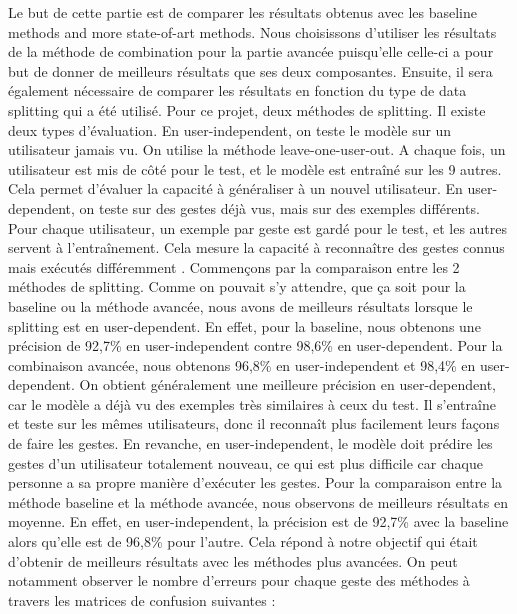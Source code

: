 \documentclass{article}
\begin{document}
Le but de cette partie est de comparer les résultats obtenus avec les baseline methods and more state-of-art methods. Nous choisissons d’utiliser les résultats de la méthode de combination pour la partie avancée puisqu’elle celle-ci a pour but de donner de meilleurs résultats que ses deux composantes. Ensuite, il sera également nécessaire de comparer les résultats en fonction du type de data splitting qui a été utilisé. Pour ce projet, deux méthodes de splitting. Il existe deux types d’évaluation. En user-independent, on teste le modèle sur un utilisateur jamais vu. On utilise la méthode leave-one-user-out.  A chaque fois, un utilisateur est mis de côté pour le test, et le modèle est entraîné sur les 9 autres. Cela permet d’évaluer la capacité à généraliser à un nouvel utilisateur. En user-dependent, on teste sur des gestes déjà vus, mais sur des exemples différents. Pour chaque utilisateur, un exemple par geste est gardé pour le test, et les autres servent à l’entraînement. Cela mesure la capacité à reconnaître des gestes connus mais exécutés différemment \cite{bulling2014}.
Commençons par la comparaison entre les 2 méthodes de splitting. 
Comme on pouvait s’y attendre, que ça soit pour la baseline ou la méthode avancée, 
nous avons de meilleurs résultats lorsque le splitting est en user-dependent. 
En effet, pour la baseline, nous obtenons une précision de 92,7\% en user-independent contre 98,6\% en user-dependent. 
Pour la combinaison avancée, nous obtenons 96,8\% en user-independent et 98,4\% en user-dependent. 
On obtient généralement une meilleure précision en user-dependent, 
car le modèle a déjà vu des exemples très similaires à ceux du test. 
Il s'entraîne et teste sur les mêmes utilisateurs, 
donc il reconnaît plus facilement leurs façons de faire les gestes. 
En revanche, en user-independent, le modèle doit prédire les gestes d’un utilisateur totalement nouveau, 
ce qui est plus difficile car chaque personne a sa propre manière d’exécuter les gestes.
Pour la comparaison entre la méthode baseline et la méthode avancée, 
nous observons de meilleurs résultats en moyenne. 
En effet, en user-independent, la précision est de 92,7\% avec la baseline alors qu’elle est de 96,8\% pour l’autre. 
Cela répond à notre objectif qui était d’obtenir de meilleurs résultats avec les méthodes plus avancées. 
On peut notamment observer le nombre d’erreurs pour chaque geste des méthodes à travers les matrices de confusion suivantes :
\end{document}
